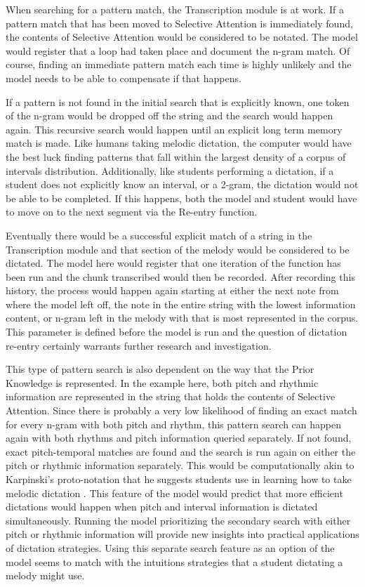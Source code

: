 \documentclass[]{book}
\begin{document}
When searching for a pattern match, the Transcription module is at work.
If a pattern match that has been moved to Selective Attention is immediately found, the contents of Selective Attention would be considered to be notated.
The model would register that a loop had taken place and document the n-gram match.
Of course, finding an immediate pattern match each time is highly unlikely and the model needs to be able to compensate if that happens.

If a pattern is not found in the initial search that is explicitly known, one token of the n-gram would be dropped off the string and the search would happen again.
This recursive search would happen until an explicit long term memory match is made.
Like humans taking melodic dictation, the computer would have the best luck finding patterns that fall within the largest density of a corpus of intervals distribution.
Additionally, like students performing a dictation, if a student does not explicitly know an interval, or a 2-gram, the dictation would not be able to be completed.
If this happens, both the model and student would have to move on to the next segment via the Re-entry function.

Eventually there would be a successful explicit match of a string in the Transcription module and that section of the melody would be considered to be dictated.
The model here would register that one iteration of the function has been run and the chunk transcribed would then be recorded.
After recording this history, the process would happen again starting at either the next note from where the model left off, the note in the entire string with the lowest information content, or n-gram left in the melody with that is most represented in the corpus.
This parameter is defined before the model is run and the question of dictation re-entry certainly warrants further research and investigation.

This type of pattern search is also dependent on the way that the Prior Knowledge is represented.
In the example here, both pitch and rhythmic information are represented in the string that holds the contents of Selective Attention.
Since there is probably a very low likelihood of finding an exact match for every n-gram with both pitch and rhythm, this pattern search can happen again with both rhythms and pitch information queried separately.
If not found, exact pitch-temporal matches are found and the search is run again on either the pitch or rhythmic information separately.
This would be computationally akin to Karpinski's proto-notation that he suggests students use in learning how to take melodic dictation \citep[p.88]{karpinskiAuralSkillsAcquisition2000}.
This feature of the model would predict that more efficient dictations would happen when pitch and interval information is dictated simultaneously.
Running the model prioritizing the secondary search with either pitch or rhythmic information will provide new insights into practical applications of dictation strategies.
Using this separate search feature as an option of the model seems to match with the intuitions strategies that a student dictating a melody might use.
\end{document}
